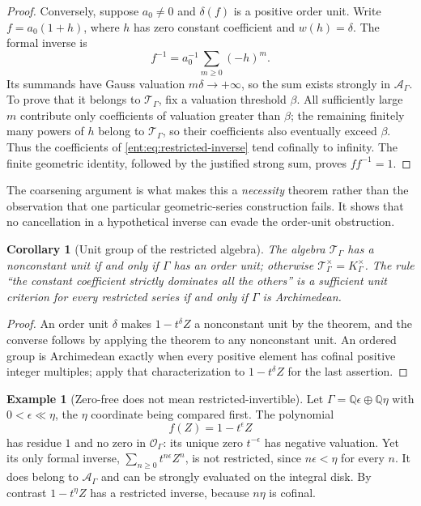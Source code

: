 \documentclass[11pt]{article}
\theoremstyle{plain}
\theoremstyle{plain}
\theoremstyle{plain}
\newtheorem{corollary}[corollary]{Corollary}
\theoremstyle{definition}
\theoremstyle{definition}
\theoremstyle{definition}
\newtheorem{example}[example]{Example}
\theoremstyle{definition}
\theoremstyle{remark}
\newcommand{\Q}{\mathbb Q}\newcommand{\Z}{\mathbb Z}\newcommand{\N}{\mathbb N}
\newcommand{\K}{K_\Gamma}\newcommand{\KD}{K_\Delta}
\newcommand{\A}{\mathcal A_\Gamma}\newcommand{\OO}{\mathcal O_\Gamma}
\newcommand{\TT}{\mathcal T_\Gamma}
\begin{document}
\begin{proof}
Conversely, suppose $a_0\ne0$ and $\delta(f)$ is a positive order unit.
Write $f=a_0(1+h)$, where $h$ has zero constant coefficient and
$w(h)=\delta$. The formal inverse is
\begin{equation}\label{ent:eq:restricted-inverse}
 f^{-1}=a_0^{-1}\sum_{m\ge0}(-h)^m.
\end{equation}
Its summands have Gauss valuation $m\delta\to+\infty$, so the sum exists
strongly in $\A$. To prove that it belongs to $\TT$, fix a valuation
threshold $\beta$. All sufficiently large $m$ contribute only coefficients of
valuation greater than $\beta$; the remaining finitely many powers of $h$
belong to $\TT$, so their coefficients also eventually exceed $\beta$. Thus
the coefficients of \eqref{ent:eq:restricted-inverse} tend cofinally to
infinity. The finite geometric identity, followed by the justified strong
sum, proves $ff^{-1}=1$.
\end{proof}

The coarsening argument is what makes this a \emph{necessity} theorem rather
than the observation that one particular geometric-series construction fails.
It shows that no cancellation in a hypothetical inverse can evade the
order-unit obstruction.

\begin{corollary}[Unit group of the restricted algebra]
\label{ent:cor:unit-structure}
The algebra $\TT$ has a nonconstant unit if and only if $\Gamma$ has an order
unit; otherwise $\TT^\times=\K^\times$. The rule ``the constant coefficient
strictly dominates all the others'' is a sufficient unit criterion for every
restricted series if and only if $\Gamma$ is Archimedean.
\end{corollary}
\begin{proof}
An order unit $\delta$ makes $1-t^\delta Z$ a nonconstant unit by the
theorem, and the converse follows by applying the theorem to any nonconstant
unit. An ordered group is Archimedean exactly when every positive element has
cofinal positive integer multiples; apply that characterization to
$1-t^\delta Z$ for the last assertion.
\end{proof}

\begin{example}[Zero-free does not mean restricted-invertible]
\label{ent:ex:ranktwo-unit}
Let $\Gamma=\Q\epsilon\oplus\Q\eta$ with $0<\epsilon\ll\eta$, the $\eta$
coordinate being compared first. The polynomial
\[
 f(Z)=1-t^\epsilon Z
\]
has residue $1$ and no zero in $\OO$: its unique zero $t^{-\epsilon}$ has
negative valuation. Yet its only formal inverse,
$\sum_{n\ge0}t^{n\epsilon}Z^n$, is not restricted, since $n\epsilon<\eta$ for
every $n$. It does belong to $\A$ and can be strongly evaluated on the
integral disk. By contrast $1-t^\eta Z$ has a restricted inverse, because
$n\eta$ is cofinal.
\end{example}
\end{document}
